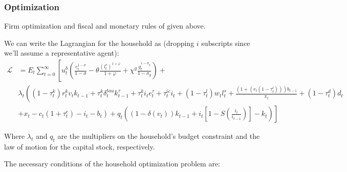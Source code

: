 \documentclass[article,11pt,letterpaper,fleqn]{article}
\theoremstyle{definition}
\numberwithin{equation}{section}
\begin{document}
\subsubsection{Optimization}

Firm optimization and fiscal and monetary rules of given above.

We can write the Lagrangian for the household as (dropping $i$ subscripts since we'll assume a representative agent):
\begin{equation}
\label{HH_Lagrangian}
\begin{split}
\mathcal{L} & = E_{t} \sum_{t=0}^{\infty} \left[ u^{b}_{t}\left( \frac{c^{1-\sigma}_{t}}{1-\sigma}-\theta\frac{(l^{s}_{t})^{1+\varphi}}{1+\varphi}+ \chi^{g}\frac{g_{t}^{1-\sigma_{g}}}{1-\sigma_{g}}\right) + \right. \\
& \left.  \lambda_{t}\left((1-\tau^{k}_{t})r^{k}_{t}v_{t}k_{t-1} + \tau^{k}_{t}\delta^{tau}_{t}k^{\tau}_{t-1} +  \tau^{k}_{t}i_{t}e^{\tau}_{t} + \tau^{ic}_{t}i_{t} + (1-\tau^{l}_{t})w_{t}l^{s}_{t} + \frac{(1+(r_{t}(1-\tau^{i}_{t})))b_{t-1}}{\pi_{t}} + (1-\tau^{d}_{t})d_{t} \right. \right. \\
& \left. \left. + x_{t} - c_{t}(1+\tau^{c}_{t}) - i_{t} - b_{t}\right) + q_{t}\left((1-\delta(v_{t}))k_{t-1} + i_{t}\left[1-S\left(\frac{i_{t}}{i_{t-1}}\right)\right]-k_{t}\right)  \right]
\end{split}
\end{equation}

Where $\lambda_{t}$ and $q_{t}$ are the multipliers on the household's budget constraint and the law of motion for the capital stock, respectively.  

The necessary conditions of the household optimization problem are:
\end{document}
